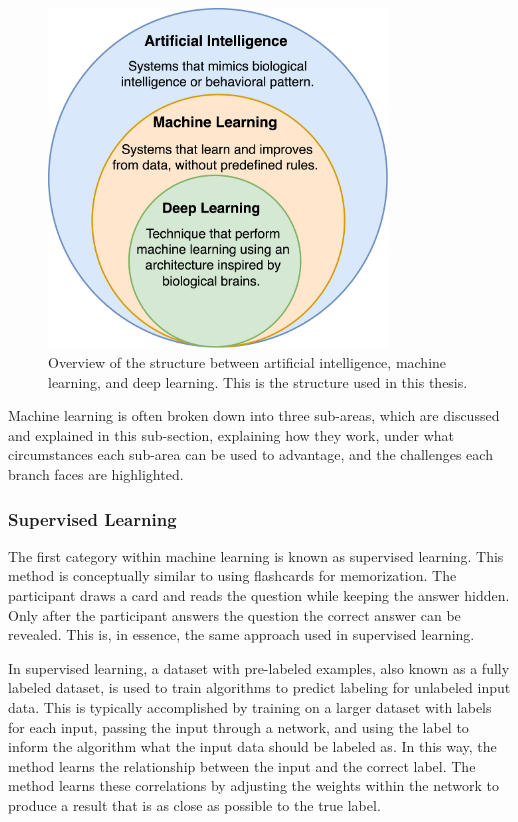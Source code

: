     \begin{figure}[htb]
        \centering
        \includegraphics[width=9cm]{images/ai_ml_dnn.png}
        \caption[Overview of the structure between artificial intelligence, machine learning, and deep learning. This is the structure used in this thesis.]{Overview of the structure between artificial intelligence, machine learning, and deep learning. This is the structure used in this thesis.%
        }
        \label{fig:ai_ml_dnn}
    \end{figure} 

    Machine learning is often broken down into three sub-areas, which are discussed and explained in this sub-section, explaining how they work, under what circumstances each sub-area can be used to advantage, and the challenges each branch faces are highlighted.

        \subsubsection{Supervised Learning}

        The first category within machine learning is known as supervised learning. This method is conceptually similar to using flashcards for memorization.
        The participant draws a card and reads the question while keeping the answer hidden. Only after the participant answers the question the correct answer can be revealed. This is, in essence, the same approach used in supervised learning.
        
        
        In supervised learning, a dataset with pre-labeled examples, also known as a fully labeled dataset, is used to train algorithms to predict labeling for unlabeled input data. This is typically accomplished by training on a larger dataset with labels for each input, passing the input through a network, and using the label to inform the algorithm what the input data should be labeled as. In this way, the method learns the relationship between the input and the correct label. The method learns these correlations by adjusting the weights within the network to produce a result that is as close as possible to the true label.
        

